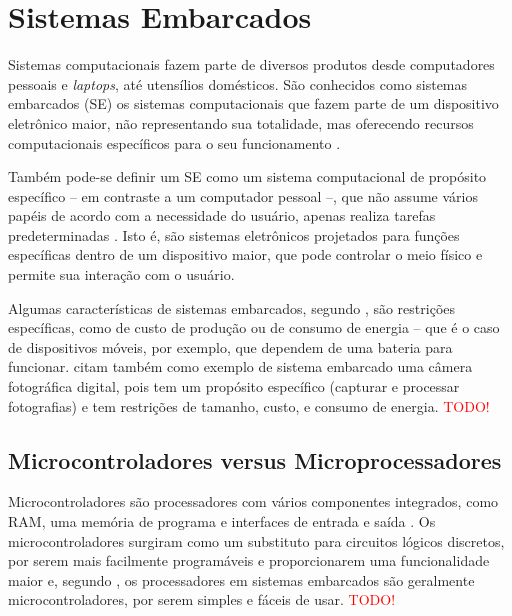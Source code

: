 \section{Sistemas Embarcados}
\label{sec:embarcados}
Sistemas computacionais fazem parte de diversos produtos desde computadores pessoais e \textit{laptops}, até utensílios domésticos. São conhecidos como sistemas embarcados (SE) os sistemas computacionais que fazem parte de um dispositivo eletrônico maior, não representando sua totalidade, mas oferecendo recursos computacionais específicos para o seu funcionamento \cite{vahid:2002}.

Também pode-se definir um SE como um sistema computacional de propósito específico -- em contraste a um computador pessoal --, que não assume vários papéis de acordo com a necessidade do usuário, apenas realiza tarefas predeterminadas \cite{heath:2002}. Isto é, são sistemas eletrônicos projetados para funções específicas dentro de um dispositivo maior, que pode controlar o meio físico e permite sua interação com o usuário.

Algumas características de sistemas embarcados, segundo , são restrições específicas, como de custo de produção ou de consumo de energia -- que é o caso de dispositivos móveis, por exemplo, que dependem de uma bateria para funcionar.  citam também como exemplo de sistema embarcado uma câmera fotográfica digital, pois tem um propósito específico (capturar e processar fotografias) e tem restrições de tamanho, custo, e consumo de energia.
\textcolor{red}{TODO!}

\subsection{Microcontroladores versus Microprocessadores}
Microcontroladores são processadores com vários componentes integrados, como RAM, uma memória de programa e interfaces de entrada e saída \cite{white:2011}. Os microcontroladores surgiram como um substituto para circuitos lógicos discretos, por serem mais facilmente programáveis e proporcionarem uma funcionalidade maior \cite{heath:2002} e, segundo , os processadores em sistemas embarcados são geralmente microcontroladores, por serem simples e fáceis de usar. 
% 
\textcolor{red}{TODO!}

